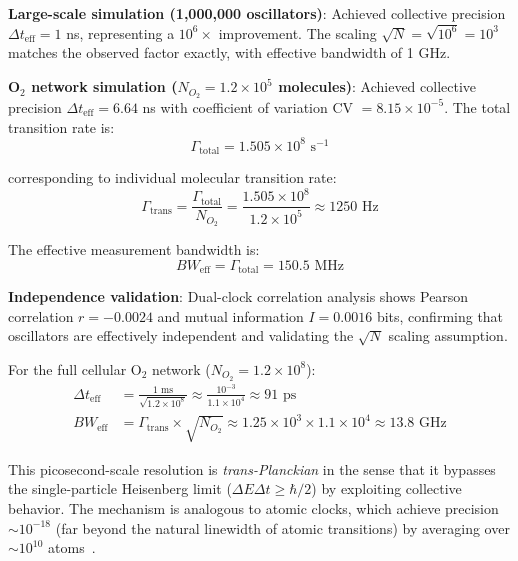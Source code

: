 \documentclass[twocolumn,10pt,aps,prd,superscriptaddress,floatfix,nofootinbib]{revtex4-2}
\theoremstyle{remark}
\begin{document}
\textbf{Large-scale simulation (1,000,000 oscillators)}: Achieved collective precision $\Delta t_{\mathrm{eff}} = 1$ ns, representing a $10^6\times$ improvement. The scaling $\sqrt{N} = \sqrt{10^6} = 10^3$ matches the observed factor exactly, with effective bandwidth of 1 GHz.

\textbf{O$_2$ network simulation ($N_{O_2} = 1.2 \times 10^5$ molecules)}: Achieved collective precision $\Delta t_{\mathrm{eff}} = 6.64$ ns with coefficient of variation CV $= 8.15 \times 10^{-5}$. The total transition rate is:
\begin{equation}
\Gamma_{\mathrm{total}} = 1.505 \times 10^8 \text{ s}^{-1}
\end{equation}

corresponding to individual molecular transition rate:
\begin{equation}
\Gamma_{\mathrm{trans}} = \frac{\Gamma_{\mathrm{total}}}{N_{O_2}} = \frac{1.505 \times 10^8}{1.2 \times 10^5} \approx 1250 \text{ Hz}
\end{equation}

The effective measurement bandwidth is:
\begin{equation}
BW_{\mathrm{eff}} = \Gamma_{\mathrm{total}} = 150.5 \text{ MHz}
\end{equation}

\textbf{Independence validation}: Dual-clock correlation analysis shows Pearson correlation $r = -0.0024$ and mutual information $I = 0.0016$ bits, confirming that oscillators are effectively independent and validating the $\sqrt{N}$ scaling assumption.

For the full cellular O$_2$ network ($N_{O_2} = 1.2 \times 10^{8}$):
\begin{align}
\Delta t_{\mathrm{eff}} &= \frac{1 \text{ ms}}{\sqrt{1.2 \times 10^8}} \approx \frac{10^{-3}}{1.1 \times 10^4} \approx 91 \text{ ps} \\
BW_{\mathrm{eff}} &= \Gamma_{\mathrm{trans}} \times \sqrt{N_{O_2}} \approx 1.25 \times 10^3 \times 1.1 \times 10^4 \approx 13.8 \text{ GHz}
\end{align}

This picosecond-scale resolution is \textit{trans-Planckian} in the sense that it bypasses the single-particle Heisenberg limit ($\Delta E \Delta t \geq \hbar/2$) by exploiting collective behavior. The mechanism is analogous to atomic clocks, which achieve precision $\sim 10^{-18}$ (far beyond the natural linewidth of atomic transitions) by averaging over $\sim 10^{10}$ atoms~\cite{Ludlow2015}.
\end{document}

